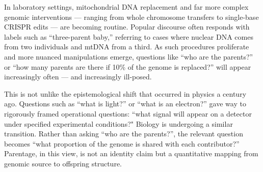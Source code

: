 \begin{commentary}
In laboratory settings, mitochondrial DNA replacement and far more complex genomic interventions — ranging from whole chromosome transfers to single-base CRISPR edits — are becoming routine. Popular discourse often responds with labels such as “three-parent baby,” referring to cases where nuclear DNA comes from two individuals and mtDNA from a third. As such procedures proliferate and more nuanced manipulations emerge, questions like “who are the parents?” or “how many parents are there if 10\% of the genome is replaced?” will appear increasingly often — and increasingly ill-posed.

This is not unlike the epistemological shift that occurred in physics a century ago. Questions such as “what is light?” or “what is an electron?” gave way to rigorously framed operational questions: “what signal will appear on a detector under specified experimental conditions?" Biology is undergoing a similar transition. Rather than asking “who are the parents?”, the relevant question becomes “what proportion of the genome is shared with each contributor?” Parentage, in this view, is not an identity claim but a quantitative mapping from genomic source to offspring structure.
\end{commentary}
\clearpage

